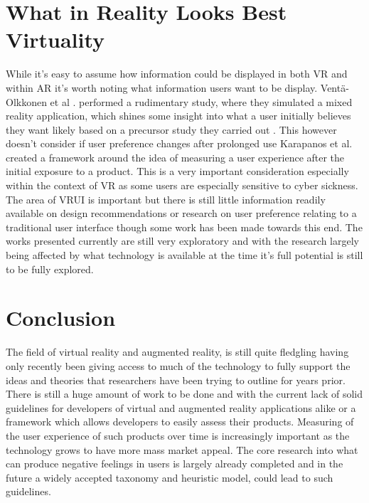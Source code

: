\documentclass{scrartcl}
\begin{document}
\section{What in Reality Looks Best Virtuality}

While it's easy to assume how information could be displayed in both VR and within AR it's worth noting what information users want to be display. Ventä-Olkkonen et al \cite{venta2014investigating}. performed a rudimentary study, where they simulated a mixed reality application, which shines some insight into what a user initially believes they want likely based on a precursor study they carried out \cite{venta2012user}. This however doesn't consider if user preference changes after prolonged use Karapanos et al. \cite{karapanos2009user} created a framework around the idea of measuring a user experience after the initial exposure to a product. This  is a very important consideration especially within the context of VR as some users are especially sensitive to cyber sickness. The area of VRUI is important but there is still little information readily available on design recommendations or research on user preference relating to a traditional user interface though some work has been made towards this end. \cite{coomans1997towards, bryson1995approaches, coutaz1993taxonomic} The works presented currently are still very exploratory and with the research largely being affected by what technology is available at the time it's full potential is still to be fully explored.

\section{Conclusion}

The field of virtual reality and augmented reality, is still quite fledgling having only recently been giving access to much of the technology to fully support the ideas and theories that researchers have been trying to outline for years prior. There is still a huge amount of work to be done and with the current lack of solid guidelines for developers of virtual and augmented reality applications alike or a framework which allows developers to easily assess their products. Measuring of the user experience of such products over time is increasingly important as the technology grows to have more mass market appeal. The core research into what can produce negative feelings in users is largely already completed and in the future a widely accepted taxonomy and heuristic model, could lead to such guidelines.




\end{document}
